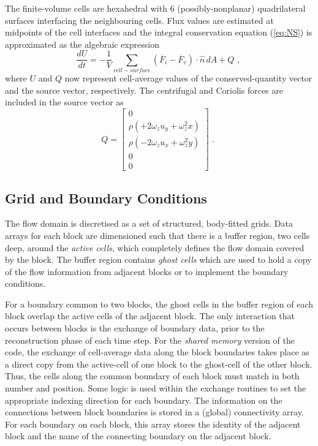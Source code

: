 \documentclass[12pt,a4paper,twoside]{article}
\begin{document}
The finite-volume cells are hexahedral with 6 (possibly-nonplanar) quadrilateral surfaces interfacing the
neighbouring cells.
Flux values are estimated at midpoints of the cell interfaces and  
the integral conservation equation (\ref{eq:NS}) is approximated as the algebraic expression
\begin{equation}
 \frac{dU}{dt} = - \frac{1}{V} \sum_{cell-surface} \left ( \overline{F}_{i} - \overline{F}_{v} \right ) \cdot \hat{n} \, dA + Q \text{ , }
 \label{eq:dUdt}
\end{equation}
where $U$ and $Q$ now represent cell-average values of the conserved-quantity vector and the source vector, respectively. 
The centrifugal and Coriolis forces are included in the source vector as
\begin{equation}
 Q = \left [ 
       \begin{array}{c} 
         0 \\
         \rho (+2 \omega_z u_y + \omega_z^2 x) \\
         \rho (-2 \omega_z u_x + \omega_z^2 y) \\
         0 \\
         0
       \end{array}
     \right ] \text{ . }
 \label{eq:Q_geom}
\end{equation}

\subsection{Grid and Boundary Conditions}
%
The flow domain is discretised as a set of structured, body-fitted grids.
Data arrays for each block are dimensioned such that
there is a buffer region, two cells deep, around the \textit{active cells},
which completely defines the flow domain covered by the block.
The buffer region contains \textit{ghost cells} which are used to hold a copy of the flow information
from adjacent blocks or to implement the boundary conditions.

For a boundary common to two blocks, the ghost cells in the
buffer region of each block overlap the active cells of the adjacent block.
The only interaction that occurs between blocks is the 
exchange of boundary data, prior to the reconstruction phase of each time step.
For the \textit{shared memory} version of the code, 
the exchange of cell-average data along the block boundaries takes place as
a direct copy from the active-cell of one block to the ghost-cell of the other block.
Thus, the cells along the common boundary of each block must match in both number and position.
Some logic is used within the exchange routines to set the appropriate indexing direction for each boundary.
The information on the connections between block boundaries is stored in a (global) connectivity array.
For each boundary on each block, this array stores the
identity of the adjacent block and the name of the connecting boundary on the adjacent block.
\end{document}
